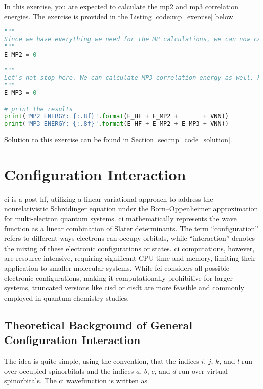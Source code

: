 In this exercise, you are expected to calculate the \acrshort{mp2} and \acrshort{mp3} correlation energies. The exercise is provided in the Listing \ref{code:mp_exercise} below.

\raggedbottom\begin{lstlisting}[language=Python, caption={\acrshort{mp2} and \acrshort{mp3} exercise code.}, label=code:mp_exercise]
"""
Since we have everything we need for the MP calculations, we can now calculate the MP2 correlation energy. The result should be stored in the "E_MP2" variable.
"""
E_MP2 = 0

"""
Let's not stop here. We can calculate MP3 correlation energy as well. Please calculate it and store it in the "E_MP3" variable.
"""
E_MP3 = 0

# print the results
print("MP2 ENERGY: {:.8f}".format(E_HF + E_MP2 +       + VNN))
print("MP3 ENERGY: {:.8f}".format(E_HF + E_MP2 + E_MP3 + VNN))
\end{lstlisting}

Solution to this exercise can be found in Section \ref{sec:mp_code_solution}.
\chapter{Configuration Interaction}

\acrfull{ci} is a \acrshort{post-hf}, utilizing a linear variational approach to address the nonrelativistic Schrödinger equation under the Born--Oppenheimer approximation for multi-electron quantum systems. \acrshort{ci} mathematically represents the wave function as a linear combination of Slater determinants. The term ``configuration'' refers to different ways electrons can occupy orbitals, while ``interaction'' denotes the mixing of these electronic configurations or states. \acrshort{ci} computations, however, are resource-intensive, requiring significant CPU time and memory, limiting their application to smaller molecular systems. While \acrfull{fci} considers all possible electronic configurations, making it computationally prohibitive for larger systems, truncated versions like \acrfull{cisd} or \acrfull{cisdt} are more feasible and commonly employed in quantum chemistry studies.

\section{Theoretical Background of General Configuration Interaction}

The idea is quite simple, using the convention, that the indices \(i\), \(j\), \(k\), and \(l\) run over occupied spinorbitals and the indices \(a\), \(b\), \(c\), and \(d\) run over virtual spinorbitals. The \acrshort{ci} wavefunction is written as

